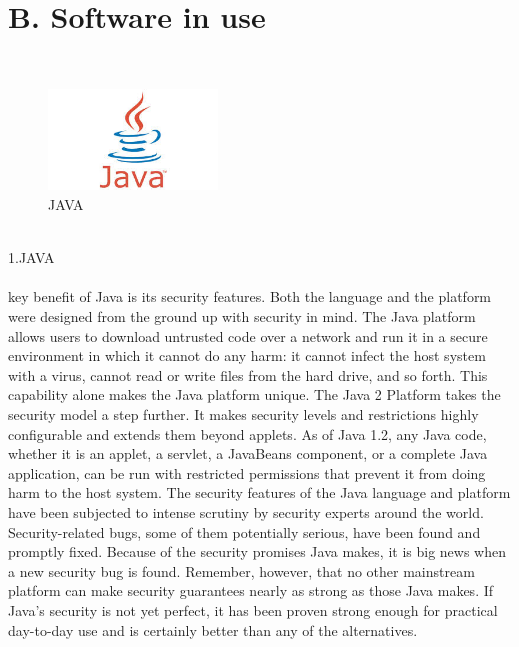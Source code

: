 \documentclass[a4paper,11pt]{IEEEtran}
\begin{document}
{\section*{B. Software in use}
~\\
\begin{figure}[!h]
        \centering
        \includegraphics[width=0.4\textwidth]{java.jpg}
        \caption{JAVA}
        \label{fig1}
\end{figure}
~\\
1.JAVA
~\\\\
key benefit of Java is its security features. Both the language and the platform were designed from the ground up with security in mind. The Java platform allows users to download untrusted code over a network and run it in a secure environment in which it cannot do any harm: it cannot infect the host system with a virus, cannot read or write files from the hard drive, and so forth. This capability alone makes the Java platform unique.
The Java 2 Platform takes the security model a step further. It makes security levels and restrictions highly configurable and extends them beyond applets. As of Java 1.2, any Java code, whether it is an applet, a servlet, a JavaBeans component, or a complete Java application, can be run with restricted permissions that prevent it from doing harm to the host system.
The security features of the Java language and platform have been subjected to intense scrutiny by security experts around the world. Security-related bugs, some of them potentially serious, have been found and promptly fixed. Because of the security promises Java makes, it is big news when a new security bug is found. Remember, however, that no other mainstream platform can make security guarantees nearly as strong as those Java makes. If Java's security is not yet perfect, it has been proven strong enough for practical day-to-day use and is certainly better than any of the alternatives.

}
\end{document}
